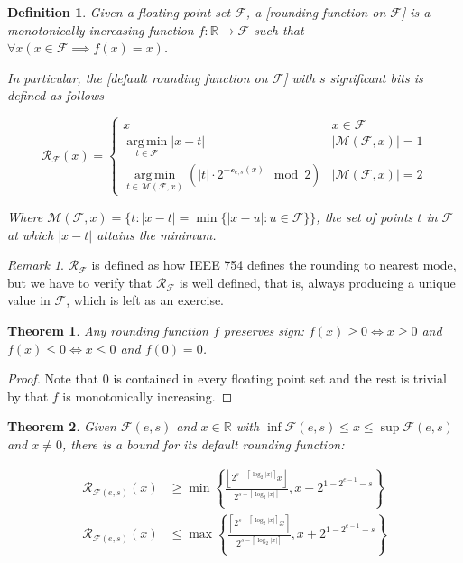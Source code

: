 \documentclass{book}
\newtheorem{definition}{Definition}
\newtheorem{theorem}{Theorem}
\theoremstyle{definition}\newtheorem{mechanism}{Mechanism}
\theoremstyle{remark}\newtheorem*{remark}{Remark}
\DeclareMathOperator*{\argmin}{arg\,min}
\begin{document}
\begin{definition}
	Given a floating point set $\mathcal{F}$, a [rounding function on $\mathcal{F}$] is a monotonically increasing function $f: \mathbb{R} \to \mathcal{F}$ such that $\forall x(x\in \mathcal F \implies f(x) = x)$.
	
	In particular, the [default rounding function on $\mathcal{F}$] with $s$ significant bits is defined as follows
	
	\begin{equation*}\mathcal{R}_{\mathcal{F}}(x) = 
		\begin{cases}
			x & x \in \mathcal{F}\\
			\argmin\limits_{t\in \mathcal{F}} |x - t| & |\mathcal{M}(\mathcal{F}, x)| = 1\\
			\argmin\limits_{t\in\mathcal{M}(\mathcal{F}, x)} \left(|t| \cdot 2^{-\mathcal o_{e, s}(x)} \mod 2\right) & |\mathcal{M}(\mathcal{F}, x)| = 2
		\end{cases}
	\end{equation*}
	
	Where $\mathcal{M}(\mathcal{F}, x) = \{ t : |x - t| = \min\{|x - u|: u\in \mathcal{F}\}\}$, the set of points $t$ in $\mathcal{F}$ at which $|x - t|$ attains the minimum.
\end{definition}

\begin{remark}
	$\mathcal{R}_{\mathcal{F}}$ is defined as how IEEE 754 defines the rounding to nearest mode, but we have to verify that $\mathcal{R}_{\mathcal{F}}$ is well defined, that is, always producing a unique value in $\mathcal{{F}}$, which is left as an exercise.
\end{remark}

\begin{theorem}
	Any rounding function $f$ preserves sign: $f(x) \ge 0 \iff x \ge 0$ and $f(x) \le 0 \iff x \le 0$ and $f(0) = 0$.
\end{theorem}

\begin{proof}
	Note that $0$ is contained in every floating point set and the rest is trivial by that $f$ is monotonically increasing.
\end{proof}

\begin{theorem}\label{thm:round-bound}
	Given $\mathcal F(e, s)$ and $x\in \mathbb R$ with $\inf \mathcal F(e, s) \le x \le \sup \mathcal F(e, s)$ and $x\ne 0$, there is a bound for its default rounding function:
	
	\begin{align*}
		\mathcal{R}_{\mathcal F(e, s)}(x) &\ge \min \left\{\frac{\left\lfloor 2 ^{s - \left\lceil \log_2 |x| \right\rceil}x\right\rfloor}{2 ^{s - \left\lceil \log_2 |x| \right\rceil}}, x - 2^{1 - 2^{e - 1} - s}\right\}\\
		\mathcal{R}_{\mathcal F(e, s)}(x) &\le \max \left\{\frac{\left\lceil 2^{s - \left\lceil \log_2 |x| \right\rceil}x\right\rceil}{2 ^{s - \left\lceil \log_2 |x| \right\rceil}}, x + 2^{1 - 2^{e - 1} - s}\right\}
	\end{align*}
\end{theorem}
\end{document}
